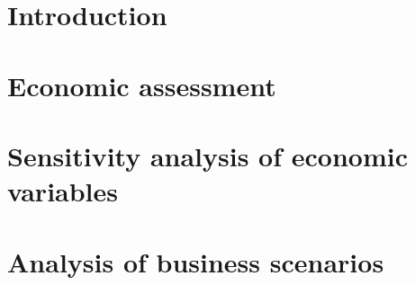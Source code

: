\section{Introduction}



\section{Economic assessment}
\section{Sensitivity analysis of economic variables}
\section{Analysis of business scenarios}